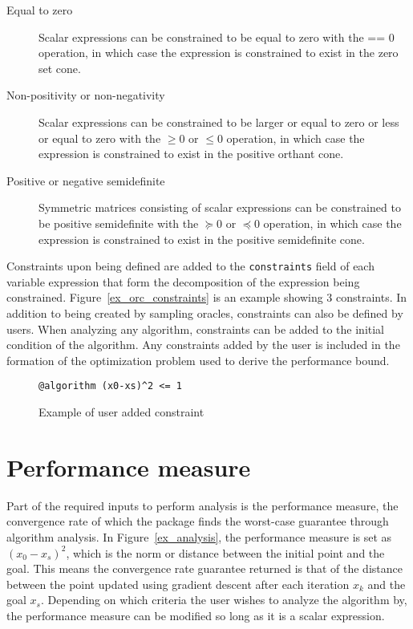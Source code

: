 \begin{description}
	\item[Equal to zero] Scalar expressions can be constrained to be equal to zero with the == 0 operation, in which case the expression is constrained to exist in the zero set cone.
	\item[Non-positivity or non-negativity] Scalar expressions can be constrained to be larger or equal to zero or less or equal to zero with the $\geq 0$ or $\leq 0$ operation, in which case the expression is constrained to exist in the positive orthant cone.
	\item[Positive or negative semidefinite] Symmetric matrices consisting of scalar expressions can be constrained to be positive semidefinite with the $\succeq 0$ or $\preceq 0$ operation, in which case the expression is constrained to exist in the positive semidefinite cone.
\end{description}

Constraints upon being defined are added to the \texttt{constraints} field of each variable expression that form the decomposition of the expression being constrained. Figure~\ref{ex_orc_constraints} is an example showing 3 constraints. In addition to being created by sampling oracles, constraints can also be defined by users. When analyzing any algorithm, constraints can be added to the initial condition of the algorithm. Any constraints added by the user is included in the formation of the optimization problem used to derive the performance bound.

\begin{figure}[h]
	\begin{lstlisting}[mathescape]
	@algorithm (x0-xs)^2 <= 1
	\end{lstlisting}
	\caption{Example of user added constraint}
	\label{ex_user_constraints}
\end{figure}

\section{Performance measure}
Part of the required inputs to perform analysis is the performance measure, the convergence rate of which the package finds the worst-case guarantee through algorithm analysis. In Figure~\ref{ex_analysis}, the performance measure is set as $ (x_0 - x_s) ^2 $, which is the norm or distance between the initial point and the goal. This means the convergence rate guarantee returned is that of the distance between the point updated using gradient descent after each iteration $ x_k $ and the goal $ x_s $. Depending on which criteria the user wishes to analyze the algorithm by, the performance measure can be modified so long as it is a scalar expression.

